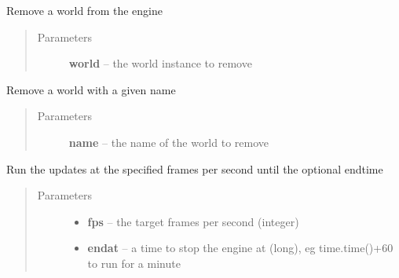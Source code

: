 \documentclass[letterpaper,10pt,english]{sphinxmanual}
\begin{document}
\begin{fulllineitems}
\begin{fulllineitems}
\end{fulllineitems}


\begin{fulllineitems}
\label{engine:serge.engine.Engine.removeWorld}
Remove a world from the engine
\begin{quote}\begin{description}
\item[{Parameters}] \leavevmode
\textbf{world} -- the world instance to remove

\end{description}\end{quote}

\end{fulllineitems}


\begin{fulllineitems}
\label{engine:serge.engine.Engine.removeWorldNamed}
Remove a world with a given name
\begin{quote}\begin{description}
\item[{Parameters}] \leavevmode
\textbf{name} -- the name of the world to remove

\end{description}\end{quote}

\end{fulllineitems}


\begin{fulllineitems}
\label{engine:serge.engine.Engine.run}
Run the updates at the specified frames per second until the optional endtime
\begin{quote}\begin{description}
\item[{Parameters}] \leavevmode\begin{itemize}
\item {} 
\textbf{fps} -- the target frames per second (integer)

\item {} 
\textbf{endat} -- a time to stop the engine at (long), eg time.time()+60 to run for a minute


\end{itemize}
\end{description}
\end{quote}
\end{fulllineitems}
\end{fulllineitems}
\end{document}
